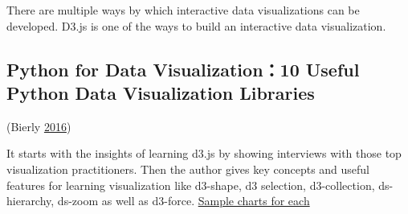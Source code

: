 \documentclass[]{book}
\begin{document}
There are multiple ways by which interactive data visualizations can be developed. D3.js is one of the ways to build an interactive data visualization.

\hypertarget{python-for-data-visualization10-useful-python-data-visualization-libraries}{%
\subsection{Python for Data Visualization：10 Useful Python Data Visualization Libraries}\label{python-for-data-visualization10-useful-python-data-visualization-libraries}}

(Bierly \protect\hyperlink{ref-PythonDataVizLibraries}{2016})

It starts with the insights of learning d3.js by showing interviews with those top visualization practitioners. Then the author gives key concepts and useful features for learning visualization like d3-shape, d3 selection, d3-collection, ds-hierarchy, ds-zoom as well as d3-force.
\href{https://blog.modeanalytics.com/python-data-visualization-libraries/}{Sample charts for each}
\end{document}
